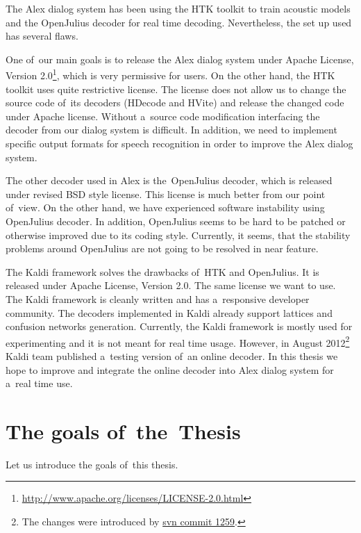 The Alex dialog system has been using the HTK toolkit\cite{htk} to train acoustic models and the OpenJulius\cite{julius} decoder for real time decoding. Nevertheless, the set up used has several flaws.

One of~our main goals is to release the Alex dialog system under Apache License, Version 2.0\footnote{\url{http://www.apache.org/licenses/LICENSE-2.0.html}}, which is very permissive for users. On the other hand, the HTK toolkit uses quite restrictive license. The license does not allow us to change the source code of~its decoders (HDecode and HVite) and release the changed code under Apache license. Without a~source code modification interfacing the decoder from our dialog system is difficult. In addition, we need to implement specific output formats for speech recognition in order to improve the Alex dialog system.

The other decoder used in Alex is the~OpenJulius decoder, which is released under revised BSD style license. This license is much better from our point of~view. On the other hand, we have experienced software instability using OpenJulius decoder. In addition, OpenJulius seems to be hard to be patched or otherwise improved due to its coding style. Currently, it seems, that the stability problems around OpenJulius are not going to be resolved in near feature.

The Kaldi framework solves the drawbacks of~HTK and OpenJulius. It is released under Apache License, Version 2.0. The same license we want to use. The Kaldi framework is cleanly written and has a~responsive developer community. The decoders implemented in Kaldi already support lattices and confusion networks generation. Currently, the Kaldi framework is mostly used for experimenting and it is not meant for real time usage. However, in August 2012\footnote{The changes were introduced by \href{https://sourceforge.net/p/kaldi/code/1259/}{svn commit 1259}.} Kaldi team published a~testing version of~an online decoder. In this thesis we hope to improve and integrate the online decoder into Alex dialog system for a~real time use.


\section{The goals of~the~Thesis} 
\label{sec:goals}
Let us introduce the goals of~this thesis.

